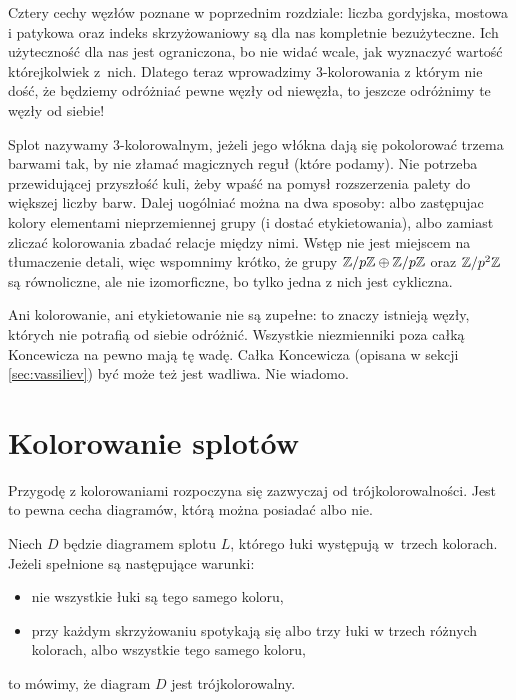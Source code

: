 

Cztery cechy węzłów poznane w poprzednim rozdziale: liczba gordyjska, mostowa i patykowa oraz indeks skrzyżowaniowy są dla nas kompletnie bezużyteczne.
Ich użyteczność dla nas jest ograniczona, bo nie widać wcale, jak wyznaczyć wartość którejkolwiek z~nich.
Dlatego teraz wprowadzimy 3-kolorowania z którym nie dość, że będziemy odróżniać pewne węzły od niewęzła, to jeszcze odróżnimy te węzły od siebie!

Splot nazywamy 3-kolorowalnym, jeżeli jego włókna dają się pokolorować trzema barwami tak, by nie złamać magicznych reguł (które podamy).
Nie potrzeba przewidującej przyszłość kuli, żeby wpaść na pomysł rozszerzenia palety do większej liczby barw.
Dalej uogólniać można na dwa sposoby: albo zastępujac kolory elementami nieprzemiennej grupy (i dostać etykietowania), albo zamiast zliczać kolorowania zbadać relacje między nimi.
Wstęp nie jest miejscem na tłumaczenie detali, więc wspomnimy krótko, że grupy $\mathbb Z/p\mathbb Z \oplus \mathbb Z/p\mathbb Z$ oraz $\mathbb Z/p^2 \mathbb Z$ są równoliczne, ale nie izomorficzne, bo tylko jedna z nich jest cykliczna.

Ani kolorowanie, ani etykietowanie nie są zupełne: to znaczy istnieją węzły, których nie potrafią od siebie odróżnić.
Wszystkie niezmienniki poza całką Koncewicza na pewno mają tę wadę.
Całka Koncewicza (opisana w sekcji \ref{sec:vassiliev}) być może też jest wadliwa.
Nie wiadomo.

\section{Kolorowanie splotów}
%

Przygodę z kolorowaniami rozpoczyna się zazwyczaj od trójkolorowalności.
Jest to pewna cecha diagramów, którą można posiadać albo nie.

\begin{definition}[trójkolorowalność]
%
    Niech $D$ będzie diagramem splotu $L$, którego łuki występują w~trzech kolorach.
    Jeżeli spełnione są następujące warunki:
    \begin{itemize}[leftmargin=*]
        \item nie wszystkie łuki są tego samego koloru,
        \item przy każdym skrzyżowaniu spotykają się albo trzy łuki w trzech różnych kolorach, albo wszystkie tego samego koloru,
    \end{itemize}
    to mówimy, że diagram $D$ jest trójkolorowalny.
\end{definition}

